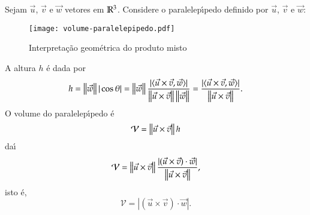 Sejam $\vec{u}$, $\vec{v}$ e $\vec{w}$ vetores em $\mathbb{R}^3$. Considere o paralelep{\'\i}pedo definido por $\vec{u}$, $\vec{v}$ e $\vec{w}$:
\begin{figure}[!h]
  \centering
  \caption{Interpreta\c{c}\~ao geom\'etrica do produto misto}
  \texttt{[image: volume-paralelepipedo.pdf]}




\end{figure}

A altura $h$ \'e dada por
\begin{align*}
  h = \left\Vert{\vec{w}}\right\Vert|\cos\theta| = \left\Vert{\vec{w}}\right\Vert\dfrac{|\langle\vec{u}\times\vec{v}, \vec{w}\rangle|}{\left\Vert{\vec{u}\times\vec{v}}\right\Vert\left\Vert{\vec{w}}\right\Vert} = \dfrac{|\langle\vec{u}\times\vec{v}, \vec{w}\rangle|}{\left\Vert{\vec{u}\times\vec{v}}\right\Vert}.
\end{align*}
O volume do paralelep{\'\i}pedo \'e
\[
  \mathcal{V} = \left\Vert{\vec{u}\times\vec{v}}\right\Vert h
\]
da{\'\i}
\[
  \mathcal{V} = \left\Vert{\vec{u}\times\vec{v}}\right\Vert\dfrac{|(\vec{u}\times\vec{v})\cdot\vec{w}|}{\left\Vert{\vec{u}\times\vec{v}}\right\Vert},
\]
isto \'e,
\begin{equation}
  \mathcal{V} = |(\vec{u}\times\vec{v})\cdot\vec{w}|.
\end{equation}

